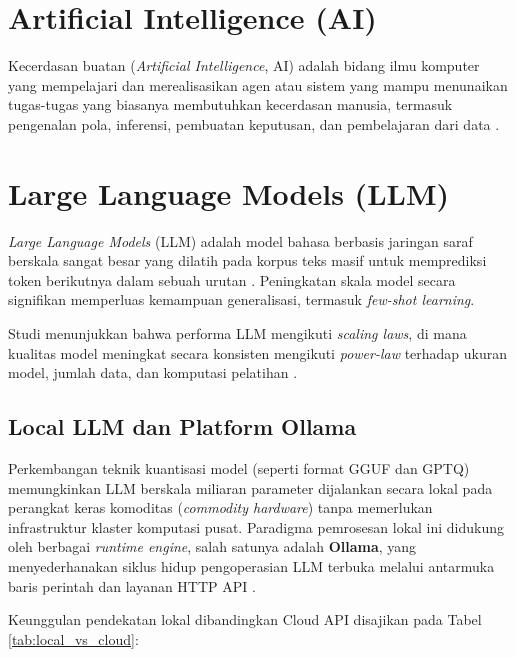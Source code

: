 \section{Artificial Intelligence (AI)}
Kecerdasan buatan (\textit{Artificial Intelligence}, AI) adalah bidang ilmu komputer
yang mempelajari dan merealisasikan agen atau sistem yang mampu menunaikan
tugas-tugas yang biasanya membutuhkan kecerdasan manusia, termasuk pengenalan pola,
inferensi, pembuatan keputusan, dan pembelajaran dari data \cite{Alhejaily2025}.

\section{Large Language Models (LLM)}
\textit{Large Language Models} (LLM) adalah model bahasa berbasis jaringan saraf
berskala sangat besar yang dilatih pada korpus teks masif untuk memprediksi token
berikutnya dalam sebuah urutan \cite{Brown2020}. Peningkatan skala model secara signifikan
memperluas kemampuan generalisasi, termasuk \textit{few-shot learning}.

Studi menunjukkan bahwa performa LLM mengikuti \textit{scaling laws}, di mana kualitas
model meningkat secara konsisten mengikuti \textit{power-law} terhadap ukuran model,
jumlah data, dan komputasi pelatihan \cite{Kaplan2020}.

\subsection{Local LLM dan Platform Ollama}
Perkembangan teknik kuantisasi model (seperti format GGUF dan GPTQ) memungkinkan LLM berskala
miliaran parameter dijalankan secara lokal pada perangkat keras komoditas (\textit{commodity hardware}) tanpa
memerlukan infrastruktur klaster komputasi pusat. Paradigma pemrosesan lokal ini didukung oleh berbagai \textit{runtime engine}, salah satunya adalah
\textbf{Ollama}, yang menyederhanakan siklus hidup pengoperasian LLM terbuka melalui
antarmuka baris perintah dan layanan HTTP API \cite{Ollama2024}.

Keunggulan pendekatan lokal dibandingkan Cloud API disajikan pada Tabel \ref{tab:local_vs_cloud}:

